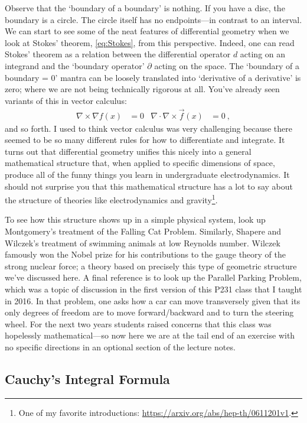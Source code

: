 Observe that the `boundary of a boundary' is nothing. If you have a disc, the boundary is a circle. The circle itself has no endpoints---in contrast to an interval. We can start to see some of the neat features of differential geometry when we look at Stokes' theorem, \eqref{eq:Stokes}, from this perspective. Indeed, one can read Stokes' theorem as a relation between the differential operator $d$ acting on an integrand and the `boundary operator' $\partial$  acting on the space. The `boundary of a boundary = 0' mantra can be loosely translated into `derivative of a derivative' is zero; where we are not being technically rigorous at all. You've already seen variants of this in vector calculus:
\begin{align}
	\nabla\times \nabla f(x) &= 0
	&
	\nabla \cdot \nabla\times \vec{f}(x) &=0 \ ,
\end{align}
and so forth. I used to think vector calculus was very challenging because there seemed to be so many different rules for how to differentiate and integrate. It turns out that differential geometry unifies this nicely into a general mathematical structure that, when applied to specific dimensions of space, produce all of the funny things you learn in undergraduate electrodynamics. It should not surprise you that this mathematical structure has a lot to say about the structure of theories like electrodynamics and gravity\footnote{One of my favorite introductions: \url{https://arxiv.org/abs/hep-th/0611201v1}.}.
\begin{exercise}
To see how this structure shows up in a simple physical system, look up Montgomery's treatment of the Falling Cat Problem. Similarly, Shapere and Wilczek's treatment of swimming animals at low Reynolds number. Wilczek famously won the Nobel prize for his contributions to the gauge theory of the strong nuclear force; a theory based on precisely this type of geometric structure we've discussed here. A final reference is to look up the Parallel Parking Problem, which was a topic of discussion in the first version of this P231 class that I taught in 2016. In that problem, one asks how a car can move transversely given that its only degrees of freedom are to move forward/backward and to turn the steering wheel. For the next two years students raised concerns that this class was hopelessly mathematical---so now here we are at the tail end of an exercise with no specific directions in an optional section of the lecture notes.
\end{exercise}

\subsection{Cauchy's Integral Formula}

